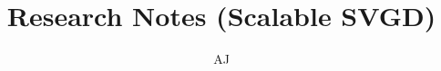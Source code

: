 

\usepackage{lipsum}
\usepackage{amsfonts}
\usepackage{graphicx}
\usepackage{epstopdf}
\usepackage{soul}
\usepackage{caption}
\usepackage{subcaption}
\usepackage{algorithm}
\usepackage{algpseudocode}
\usepackage{enumitem}
\usepackage{comment}
\ifpdf
\else
\fi


\usepackage{booktabs}
\usepackage{multirow}
\usepackage{annotate-equations}

\usepackage{enumitem}

\newcommand{\creflastconjunction}{, and~}




\title{Research Notes (Scalable SVGD)}

\author{AJ}

\usepackage{amsopn}
\DeclareMathOperator{\diag}{diag}


\makeatletter
\newcommand*{\addFileDependency}[1]{%
  \typeout{(#1)}%
  \@addtofilelist{#1}%
  \IfFileExists{#1}{}{\typeout{No file #1.}}%
}
\makeatother

